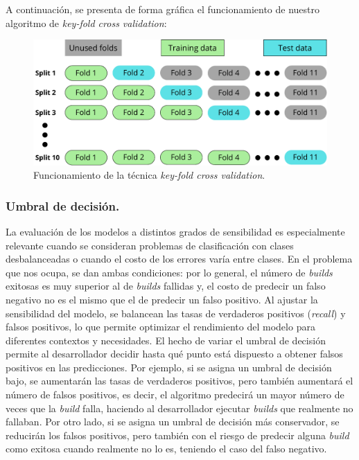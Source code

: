 A continuación, se presenta de forma gráfica el funcionamiento de nuestro algoritmo de
\textit{key-fold cross validation}:

\begin{figure}[H]
    \centering
    \includegraphics[scale=0.5]{images/Cross validation.pdf}
    \caption{Funcionamiento de la técnica \textit{key-fold cross validation}.}
    \label{fig:confusion_matrix}
\end{figure}

\subsubsection{Umbral de decisión.}
La evaluación de los modelos a distintos grados de sensibilidad es especialmente relevante cuando
se consideran problemas de clasificación con clases desbalanceadas o cuando el costo de los
errores varía entre clases. En el problema que nos ocupa, se dan ambas condiciones: por lo
general, el número de \textit{builds} exitosas es muy superior al de \textit{builds} fallidas y,
el costo de predecir un falso negativo no es el mismo que el de predecir un falso positivo. Al
ajustar la sensibilidad del modelo, se balancean las tasas de verdaderos positivos
(\textit{recall}) y falsos positivos, lo que permite optimizar el rendimiento del modelo para
diferentes contextos y necesidades. El hecho de variar el umbral de decisión permite al
desarrollador decidir hasta qué punto está dispuesto a obtener falsos positivos en las
predicciones. Por ejemplo, si se asigna un umbral de decisión bajo, se aumentarán las tasas de
verdaderos positivos, pero también aumentará el número de falsos positivos, es decir, el algoritmo
predecirá un mayor número de veces que la \textit{build} falla, haciendo al desarrollador ejecutar
\textit{builds} que realmente no fallaban. Por otro lado, si se asigna un umbral de decisión más
conservador, se reducirán los falsos positivos, pero también con el riesgo de predecir alguna
\textit{build} como exitosa cuando realmente no lo es, teniendo el caso del falso negativo.\\


